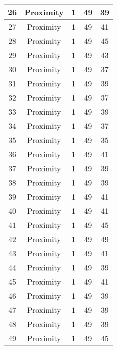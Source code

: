 \documentclass[results.tex]{subfiles}
\begin{document}
\begin{center}
\begin{tabular}{| c || c | c | c | c |}
    \hline
    26 & Proximity & 1 & 49 & 39 \\ 
    \hline
    27 & Proximity & 1 & 49 & 41 \\ 
    \hline
    28 & Proximity & 1 & 49 & 45 \\ 
    \hline
    29 & Proximity & 1 & 49 & 43 \\ 
    \hline
    30 & Proximity & 1 & 49 & 37 \\ 
    \hline
    31 & Proximity & 1 & 49 & 39 \\ 
    \hline
    32 & Proximity & 1 & 49 & 37 \\ 
    \hline
    33 & Proximity & 1 & 49 & 39 \\ 
    \hline
    34 & Proximity & 1 & 49 & 37 \\ 
    \hline
    35 & Proximity & 1 & 49 & 35 \\ 
    \hline
    36 & Proximity & 1 & 49 & 41 \\ 
    \hline
    37 & Proximity & 1 & 49 & 39 \\ 
    \hline
    38 & Proximity & 1 & 49 & 39 \\ 
    \hline
    39 & Proximity & 1 & 49 & 41 \\ 
    \hline
    40 & Proximity & 1 & 49 & 41 \\ 
    \hline
    41 & Proximity & 1 & 49 & 45 \\ 
    \hline
    42 & Proximity & 1 & 49 & 49 \\ 
    \hline
    43 & Proximity & 1 & 49 & 41 \\ 
    \hline
    44 & Proximity & 1 & 49 & 39 \\ 
    \hline
    45 & Proximity & 1 & 49 & 41 \\ 
    \hline
    46 & Proximity & 1 & 49 & 39 \\ 
    \hline
    47 & Proximity & 1 & 49 & 39 \\ 
    \hline
    48 & Proximity & 1 & 49 & 39 \\ 
    \hline
    49 & Proximity & 1 & 49 & 45 \\ 
    \hline   \end{tabular}
\end{center}
\end{document}
